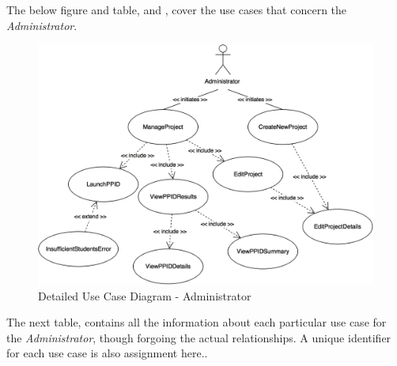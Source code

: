 \documentclass[12pt,letterpaper]{article}
\begin{document}
The below figure and table,  and , cover the use cases that concern the {\it Administrator}.

\begin{figure}[H]
	\centering{}
	\includegraphics[scale=0.26]{imgs/detailed-administrator-use-case-diagram.png}
	\caption{Detailed Use Case Diagram - Administrator}
\end{figure}
The next table,  contains all the information about each particular use case for the {\it Administrator}, though forgoing the actual relationships. A unique identifier for each use case is also assignment here.. %
\end{document}
